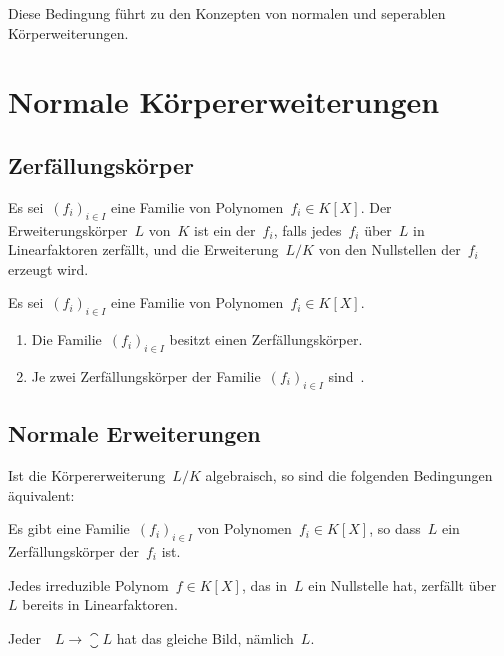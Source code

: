 Diese Bedingung führt zu den Konzepten von normalen und seperablen Körperweiterungen.




\section{Normale Körpererweiterungen}



\subsection{Zerfällungskörper}

\begin{definition}
  Es sei~$(f_i)_{i \in I}$ eine Familie von Polynomen~$f_i \in K[X]$.
  Der Erweiterungskörper~$L$ von~$K$ ist ein  der~$f_i$, falls jedes~$f_i$ über~$L$ in Linearfaktoren zerfällt, und die Erweiterung~$L/K$ von den Nullstellen der~$f_i$ erzeugt wird.
\end{definition}

\begin{proposition}
  Es sei~$(f_i)_{i \in I}$ eine Familie von Polynomen~$f_i \in K[X]$.
  \begin{enumerate}
    \item
      Die Familie~$(f_i)_{i \in I}$ besitzt einen Zerfällungskörper.
    \item
      Je zwei Zerfällungskörper der Familie~$(f_i)_{i \in I}$ sind~.
  \end{enumerate}
\end{proposition}



\subsection{Normale Erweiterungen}

\begin{proposition}
  \label{characterizations of normal field extensions}
  Ist die Körpererweiterung~$L/K$ algebraisch, so sind die folgenden Bedingungen äquivalent:
  \begin{equivlist}
    \item
      Es gibt eine Familie~$(f_i)_{i \in I}$ von Polynomen~$f_i \in K[X]$, so dass~$L$ ein Zerfällungskörper der~$f_i$ ist.
    \item
      Jedes irreduzible Polynom~$f \in K[X]$, das in~$L$ ein Nullstelle hat, zerfällt über~$L$ bereits in Linearfaktoren.
    \item
      Jeder~~$L \to \closure{L}$ hat das gleiche Bild, nämlich~$L$.
  \end{equivlist}
\end{proposition}

